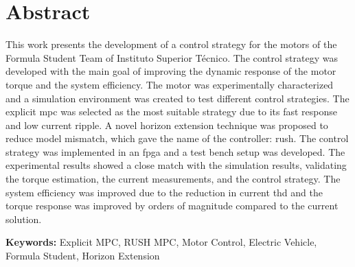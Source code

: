 
\section*{Abstract}


This work presents the development of a control strategy for the motors of the Formula Student Team of Instituto Superior Técnico. The control strategy was developed with the main goal of improving the dynamic response of the motor torque and the system efficiency. The motor was experimentally characterized and a simulation environment was created to test different control strategies. The explicit \gls{mpc} was selected as the most suitable strategy due to its fast response and low current ripple. A novel horizon extension technique was proposed to reduce model mismatch, which gave the name of the controller: \acrfull{rush}. The control strategy was implemented in an \gls{fpga} and a test bench setup was developed. The experimental results showed a close match with the simulation results, validating the torque estimation, the current measurements, and the control strategy. The system efficiency was improved due to the reduction in current \gls{thd} and the torque response was improved by orders of magnitude compared to the current solution.
\vfill

\textbf{\Large Keywords:} Explicit MPC, RUSH MPC, Motor Control, Electric Vehicle, Formula Student, Horizon Extension
